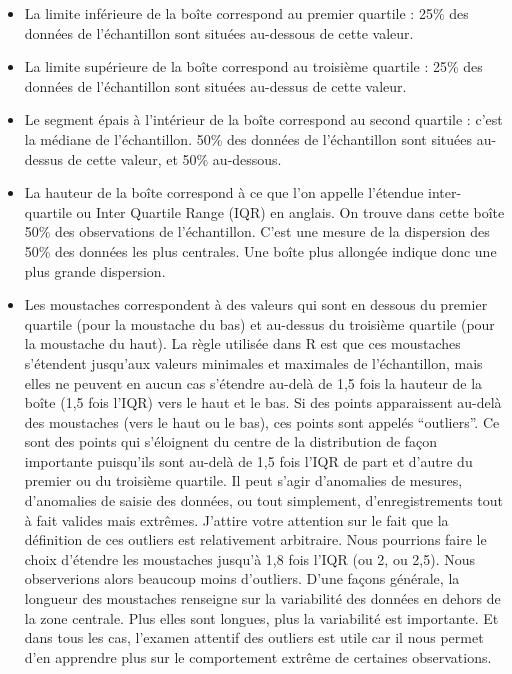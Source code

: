 \documentclass[a4paperpaper,]{article}
\providecommand{\tightlist}{%
  \setlength{\itemsep}{0pt}\setlength{\parskip}{0pt}}
\begin{document}
\begin{itemize}
\tightlist
\item
  La limite inférieure de la boîte correspond au premier quartile : 25\% des données de l'échantillon sont situées au-dessous de cette valeur.
\item
  La limite supérieure de la boîte correspond au troisième quartile : 25\% des données de l'échantillon sont situées au-dessus de cette valeur.
\item
  Le segment épais à l'intérieur de la boîte correspond au second quartile : c'est la médiane de l'échantillon. 50\% des données de l'échantillon sont situées au-dessus de cette valeur, et 50\% au-dessous.
\item
  La hauteur de la boîte correspond à ce que l'on appelle l'étendue inter-quartile ou Inter Quartile Range (IQR) en anglais. On trouve dans cette boîte 50\% des observations de l'échantillon. C'est une mesure de la dispersion des 50\% des données les plus centrales. Une boîte plus allongée indique donc une plus grande dispersion.
\item
  Les moustaches correspondent à des valeurs qui sont en dessous du premier quartile (pour la moustache du bas) et au-dessus du troisième quartile (pour la moustache du haut). La règle utilisée dans R est que ces moustaches s'étendent jusqu'aux valeurs minimales et maximales de l'échantillon, mais elles ne peuvent en aucun cas s'étendre au-delà de 1,5 fois la hauteur de la boîte (1,5 fois l'IQR) vers le haut et le bas. Si des points apparaissent au-delà des moustaches (vers le haut ou le bas), ces points sont appelés ``outliers''. Ce sont des points qui s'éloignent du centre de la distribution de façon importante puisqu'ils sont au-delà de 1,5 fois l'IQR de part et d'autre du premier ou du troisième quartile. Il peut s'agir d'anomalies de mesures, d'anomalies de saisie des données, ou tout simplement, d'enregistrements tout à fait valides mais extrêmes. J'attire votre attention sur le fait que la définition de ces outliers est relativement arbitraire. Nous pourrions faire le choix d'étendre les moustaches jusqu'à 1,8 fois l'IQR (ou 2, ou 2,5). Nous observerions alors beaucoup moins d'outliers. D'une façons générale, la longueur des moustaches renseigne sur la variabilité des données en dehors de la zone centrale. Plus elles sont longues, plus la variabilité est importante. Et dans tous les cas, l'examen attentif des outliers est utile car il nous permet d'en apprendre plus sur le comportement extrême de certaines observations.
\end{itemize}
\end{document}
